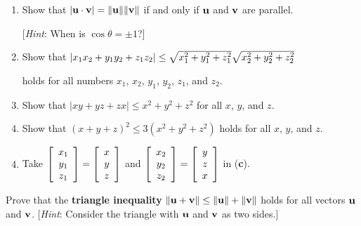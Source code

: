 \begin{multicols}{2}
\begin{ex}
\begin{enumerate}[label={\alph*.}]
\item Show that $|\textbf{u} \cdot \textbf{v}| = \|\textbf{u}\|\|\textbf{v}\|$ if and only if $\textbf{u}$ and $\textbf{v}$ are parallel.


[\textit{Hint}: When is $\cos \theta = \pm 1$?]

\item Show that $|x_{1}x_{2} + y_{1}y_{2} + z_{1}z_{2}| \\ \leq \sqrt{x_{1}^2 + y_{1}^2 + z_{1}^2}\sqrt{x_{2}^2 + y_{2}^2 + z_{2}^2}$

holds for all numbers $x_{1}$, $x_{2}$, $y_{1}$, $y_{2}$, $z_{1}$, and $z_{2}$.

\item Show that $|xy + yz + zx| \leq x^{2} + y^{2} + z^{2}$ for all $x$, $y$, and $z$.

\item Show that $(x + y + z)^{2} \leq 3(x^{2} + y^{2} + z^{2})$ holds for all $x$, $y$, and $z$.

\end{enumerate}
\begin{sol}
\begin{enumerate}[label={\alph*.}]
\setcounter{enumi}{3}
\item  Take $\left[
\begin{array}{c}
x_{1}\\
y_{1}\\
z_{1}
\end{array}
\right]
= 
\left[
\begin{array}{c}
x\\
y\\
z
\end{array}
\right]$ and $\left[
\begin{array}{c}
x_{2}\\
y_{2}\\
z_{2}
\end{array}
\right]
= 
\left[
\begin{array}{c}
y\\
z\\
x
\end{array}
\right]$ in (\textbf{c}).


\end{enumerate}
\end{sol}
\end{ex}

\begin{ex}
Prove that the \textbf{triangle inequality} $\| \textbf{u} + \textbf{v} \| \leq \|\textbf{u}\| + \|\textbf{v}\|$ holds for all vectors $\textbf{u}$ and $\textbf{v}$. [\textit{Hint}: Consider the triangle with $\textbf{u}$ and $\textbf{v}$ as two sides.]
\end{ex}
\end{multicols}
